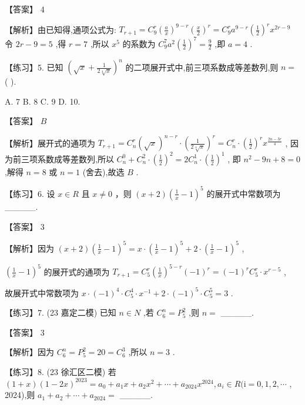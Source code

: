 \documentclass[10pt]{article}
\begin{document}
【答案】 4

【解析】由已知得,通项公式为: \({T}_{r + 1} = {C}_{9}^{r}{\left( \frac{a}{x}\right) }^{9 - r}{\left( \frac{x}{2}\right) }^{r} = {C}_{9}^{r}{a}^{9 - r}{\left( \frac{1}{2}\right) }^{r}{x}^{{2r} - 9}\) 令 \({2r} - 9 = 5\) ,得 \(r = 7\) ,所以 \({x}^{5}\) 的系数为 \({C}_{9}^{7}{a}^{2}{\left( \frac{1}{2}\right) }^{7} = \frac{9}{2}\) ,即 \(a = 4\) .

【练习】5. 已知 \({\left( \sqrt{x} + \frac{1}{2\sqrt[4]{x}}\right) }^{n}\) 的二项展开式中,前三项系数成等差数列,则 \(n =\) (   ).

A. 7 B. 8 C. 9 D. 10.

【答案】 \(B\)

【解析】展开式的通项为 \({T}_{r + 1} = {C}_{n}^{r}{\left( \sqrt{x}\right) }^{n - r} \cdot  {\left( \frac{1}{2\sqrt[4]{x}}\right) }^{r} = {C}_{n}^{r} \cdot  {\left( \frac{1}{2}\right) }^{r}{x}^{\frac{{2n} - {3r}}{4}}\) , 因为前三项系数成等差数列,所以 \({C}_{n}^{0} + {C}_{n}^{2} \cdot  {\left( \frac{1}{2}\right) }^{2} = 2{C}_{n}^{1} \cdot  {\left( \frac{1}{2}\right) }^{1}\) , 即 \({n}^{2} - {9n} + 8 = 0\) ,解得 \(n = 8\) 或 \(n = 1\) (舍去),故选 \(B\) .

【练习】6. 设 \(x \in  R\) 且 \(x \neq  0\) ，则 \(\left( {x + 2}\right) {\left( \frac{1}{x} - 1\right) }^{5}\) 的展开式中常数项为\_\_\_\_\_.

【答案】 3

【解析】因为 \(\left( {x + 2}\right) {\left( \frac{1}{x} - 1\right) }^{5} = x \cdot  {\left( \frac{1}{x} - 1\right) }^{5} + 2 \cdot  {\left( \frac{1}{x} - 1\right) }^{5}\) ,

\({\left( \frac{1}{x} - 1\right) }^{5}\) 的展开式的通项为 \({T}_{r + 1} = {C}_{5}^{r}{\left( \frac{1}{x}\right) }^{5 - r}{\left( -1\right) }^{r} = {\left( -1\right) }^{r}{C}_{5}^{r} \cdot  {x}^{r - 5}\) ,

故展开式中常数项为 \(x \cdot  {\left( -1\right) }^{4} \cdot  {C}_{5}^{4} \cdot  {x}^{-1} + 2 \cdot  {\left( -1\right) }^{5} \cdot  {C}_{5}^{5} = 3\) .

【练习】7. (23 嘉定二模) 已知 \(n \in  N\) ,若 \({C}_{6}^{n} = {P}_{5}^{2}\) ,则 \(n =\) \_\_\_\_\_.

【答案】 3

【解析】因为 \({C}_{6}^{n} = {P}_{5}^{2} = {20} = {C}_{6}^{3}\) ,所以 \(n = 3\) .

【练习】8. (23 徐汇区二模) 若 \(\left( {1 + x}\right) {\left( 1 - 2x\right) }^{2023} = {a}_{0} + {a}_{1}x + {a}_{2}{x}^{2} + \cdots  + {a}_{2024}{x}^{2024},{a}_{i} \in  R(\mathrm{i} = 0,1,2,\cdots\) , 2024),则 \({a}_{1} + {a}_{2} + \cdots  + {a}_{2024} =\) \_\_\_\_\_.
\end{document}
